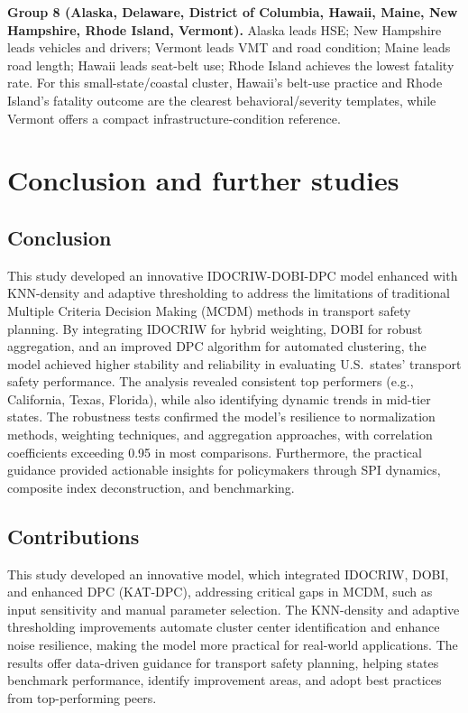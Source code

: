 \documentclass{article}
\begin{document}
\textbf{Group 8 (Alaska, Delaware, District of Columbia, Hawaii, Maine, New Hampshire, Rhode Island, Vermont).} Alaska leads HSE; New Hampshire leads vehicles and drivers; Vermont leads VMT and road condition; Maine leads road length; Hawaii leads seat-belt use; Rhode Island achieves the lowest fatality rate. For this small-state/coastal cluster, Hawaii's belt-use practice and Rhode Island's fatality outcome are the clearest behavioral/severity templates, while Vermont offers a compact infrastructure-condition reference.


\section{Conclusion and further studies}

\subsection{Conclusion}
This study developed an innovative IDOCRIW-DOBI-DPC model enhanced with KNN-density and adaptive thresholding to address the limitations of traditional Multiple Criteria Decision Making (MCDM) methods in transport safety planning. By integrating IDOCRIW for hybrid weighting, DOBI for robust aggregation, and an improved DPC algorithm for automated clustering, the model achieved higher stability and reliability in evaluating U.S.\ states' transport safety performance. The analysis revealed consistent top performers (e.g., California, Texas, Florida), while also identifying dynamic trends in mid-tier states. The robustness tests confirmed the model's resilience to normalization methods, weighting techniques, and aggregation approaches, with correlation coefficients exceeding 0.95 in most comparisons. Furthermore, the practical guidance provided actionable insights for policymakers through SPI dynamics, composite index deconstruction, and benchmarking.

\subsection{Contributions}
This study developed an innovative model, which integrated IDOCRIW, DOBI, and enhanced DPC (KAT-DPC), addressing critical gaps in MCDM, such as input sensitivity and manual parameter selection. The KNN-density and adaptive thresholding improvements automate cluster center identification and enhance noise resilience, making the model more practical for real-world applications. The results offer data-driven guidance for transport safety planning, helping states benchmark performance, identify improvement areas, and adopt best practices from top-performing peers.
\end{document}
